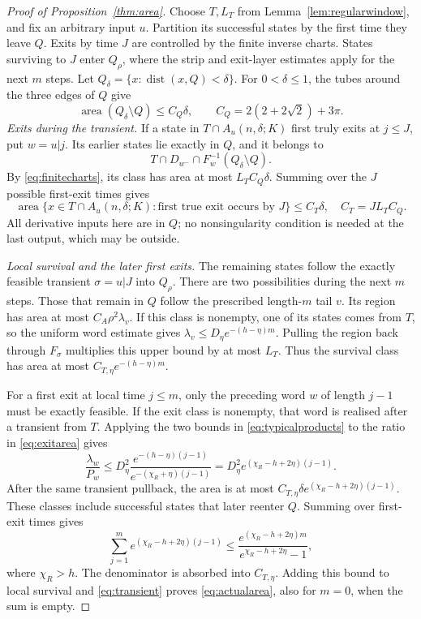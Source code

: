 \documentclass[11pt]{amsart}
\theoremstyle{definition}
\theoremstyle{remark}
\newcommand{\area}{\operatorname{area}}
\newcommand{\dist}{\operatorname{dist}}
\numberwithin{equation}{section}
\begin{document}
\begin{proof}[Proof of Proposition~\ref{thm:area}]
Choose $T,L_T$ from Lemma~\ref{lem:regularwindow}, and fix an
arbitrary input $u$. Partition its successful states by the first
time they leave $Q$. Exits by time $J$ are controlled by the
finite inverse charts. States surviving to $J$ enter $Q_\rho$,
where the strip and exit-layer estimates apply for the next $m$
steps.
Let \(Q_\delta=\{x:\dist(x,Q)<\delta\}\).
For \(0<\delta\le1\), the tubes around the three edges of \(Q\) give
\[
\area(Q_\delta\setminus Q)\le C_Q\delta,\qquad
C_Q=2(2+2\sqrt2)+3\pi .
\]
\smallskip
\emph{Exits during the transient.}
If a state in \(T\cap A_u(n,\delta;K)\) first truly exits at
\(j\le J\), put \(w=u|j\). Its earlier states lie exactly in \(Q\),
and it belongs to
\[
T\cap D_{w^-}\cap F_w^{-1}(Q_\delta\setminus Q).
\]
By \eqref{eq:finitecharts}, its class has area at most
\(L_TC_Q\delta\). Summing over the \(J\) possible first-exit times
gives
\begin{equation}\label{eq:transient}
\area\{x\in T\cap A_u(n,\delta;K):
             \text{first true exit occurs by }J\}\le C_T\delta,
\quad C_T=JL_TC_Q .
\end{equation}
All derivative inputs here are in \(Q\); no nonsingularity condition
is needed at the last output, which may be outside.

\smallskip
\emph{Local survival and the later first exits.}
The remaining states follow the exactly feasible transient
$\sigma=u|J$ into $Q_\rho$. There are two possibilities during
the next $m$ steps. Those that remain in $Q$ follow the prescribed
length-$m$ tail $v$. Its region has area at most $C_A\rho^2\lambda_v$.
If this class is nonempty, one of its states comes from $T$, so
the uniform word estimate gives
$\lambda_v\le D_\eta e^{-(h-\eta)m}$. Pulling the region back
through $F_\sigma$ multiplies this upper bound by at most $L_T$.
Thus the survival class has area at most
$C_{T,\eta}e^{-(h-\eta)m}$.

For a first exit at local time $j\le m$, only the preceding
word $w$ of length $j-1$ must be exactly feasible. If the exit
class is nonempty, that word is realised after a transient from
$T$. Applying the two bounds in \eqref{eq:typicalproducts} to
the ratio in \eqref{eq:exitarea} gives
\[
\frac{\lambda_w}{P_w}
\le D_\eta^2
  \frac{e^{-(h-\eta)(j-1)}}{e^{-(\chi_R+\eta)(j-1)}}
=D_\eta^2 e^{(\chi_R-h+2\eta)(j-1)}.
\]
After the same transient pullback, the area is at most
$C_{T,\eta}\delta e^{(\chi_R-h+2\eta)(j-1)}$.
These classes include successful states that later reenter $Q$.
Summing over first-exit times gives
\[
\sum_{j=1}^{m}e^{(\chi_R-h+2\eta)(j-1)}
\le \frac{e^{(\chi_R-h+2\eta)m}}
              {e^{\chi_R-h+2\eta}-1},
\]
where $\chi_R>h$. The denominator is absorbed into $C_{T,\eta}$.
Adding this bound to local survival and \eqref{eq:transient}
proves \eqref{eq:actualarea}, also for $m=0$, when the sum is empty.
\end{proof}
\end{document}
